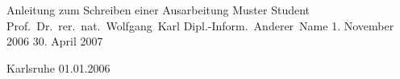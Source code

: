 \documentclass[a4paper,titlepage,12pt,twoside,openright,abstracton,headsepline,halfparskip,final,BCOR1.0cm]{scrreprt}
\begin{document}
	\pagestyle{empty}

			{Anleitung zum Schreiben einer Ausarbeitung}  %
			{Muster Student}                %
			{Prof.~Dr.~rer.~nat.~Wolfgang~Karl}
			{Dipl.-Inform.~Anderer~Name} %
			{1. November 2006}                               %
			{30. April 2007}                                 %

			{Karlsruhe}    %
			{01.01.2006}    %

	\cleardoublepage
	
% 	
	
	\cleardoublepage

	\pagestyle{scrheadings}

	\tableofcontents
	\listoftables
	\listoffigures
	\cleardoublepage

	\pagestyle{scrheadings}
     
	


% 	


	

%  


	
\end{document}
